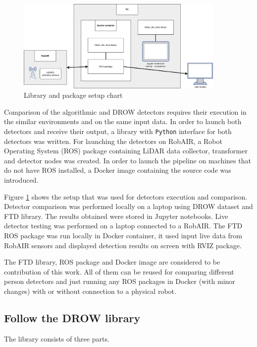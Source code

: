 \documentclass{article}
\begin{document}
\begin{figure}[t!]
	\centering
	\includegraphics[width=0.9\textwidth]{ftd_setup_chart}
	\caption{Library and package setup chart}
	\label{fig:ftd_setup_chart}
\end{figure}

Comparison of the algorithmic and DROW detectors requires their execution in the similar environments and on the same input data.
In order to launch both detectors and receive their output, a library with \texttt{Python} interface for both detectors was written.
For launching the detectors on RobAIR, a Robot Operating System (ROS)\cite{ros_site} package containing LiDAR data collector, transformer and detector nodes was created.
In order to launch the pipeline on machines that do not have ROS installed, a Docker image containing the source code was introduced.

Figure \ref{fig:ftd_setup_chart} shows the setup that was used for detectors execution and comparison.
Detector comparison was performed locally on a laptop using DROW dataset and FTD library.
The results obtained were stored in Jupyter notebooks.
Live detector testing was performed on a laptop connected to a RobAIR.
The FTD ROS package was run locally in Docker container, it used input live data from RobAIR sensors and displayed detection results on screen with RVIZ\cite{rviz_wiki} package.

The FTD library, ROS package and Docker image are considered to be contribution of this work.
All of them can be reused for comparing different person detectors and just running any ROS packages in Docker (with minor changes) with or without connection to a physical robot.

\subsection{Follow the DROW library}

The library consists of three parts.
\end{document}
